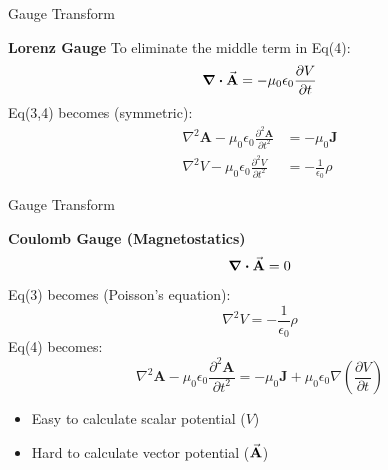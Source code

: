 \documentclass[9pt]{beamer}
\begin{document}
\begin{frame}{Gauge Transform}
    \begin{beamerboxesrounded}[shadow=true]{\bf Lorenz Gauge}
        To eliminate the middle term in Eq(4):
        \begin{equation*}
            \div \va{A} = -\mu_0\epsilon_0\pdv{V}{t}
        \end{equation*}
        Eq(3,4) becomes (symmetric):
        \begin{align*}
            \nabla^{2} \mathbf{A}-\mu_{0} \epsilon_{0} \frac{\partial^{2} \mathbf{A}}{\partial t^{2}} &= -\mu_{0} \mathbf{J} \\ 
            \nabla^{2} V-\mu_{0} \epsilon_{0} \frac{\partial^{2} V}{\partial t^{2}} &= -\frac{1}{\epsilon_{0}} \rho
        \end{align*}
    \end{beamerboxesrounded}
\end{frame}


\begin{frame}{Gauge Transform}
    \begin{beamerboxesrounded}[shadow=true]{\bf Coulomb Gauge (Magnetostatics)}
        \begin{equation*}
            \div\va{A} = 0
        \end{equation*}
        Eq(3) becomes (Poisson's equation):
        \begin{equation*}
            \nabla^{2} V=-\frac{1}{\epsilon_{0}} \rho
        \end{equation*}
        Eq(4) becomes:
        \begin{equation*}
            \nabla^{2} \mathbf{A}-\mu_{0} \epsilon_{0} \frac{\partial^{2} \mathbf{A}}{\partial t^{2}}=-\mu_{0} \mathbf{J}+\mu_{0} \epsilon_{0} \nabla\left(\frac{\partial V}{\partial t}\right)
        \end{equation*}

        \begin{itemize}
            \item Easy to calculate scalar potential ($V$)
            \item Hard to calculate vector potential ($\va{A}$)
        \end{itemize}
    \end{beamerboxesrounded}
\end{frame}
\end{document}
